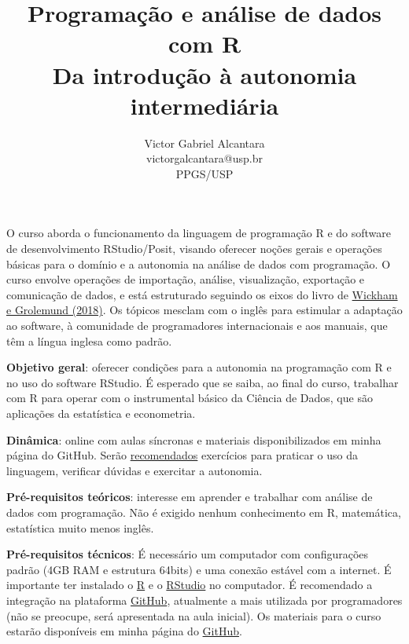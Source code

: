 \documentclass[a4paper,12pt]{article}
\title{\vspace{-3.5cm}Programação e análise de dados com R \\ \large Da introdução à autonomia intermediária}
\author{Victor Gabriel Alcantara \\ victorgalcantara@usp.br \\ PPGS/USP}
\date{}
\begin{document}
\maketitle

O curso aborda o funcionamento da linguagem de programação R e do software de desenvolvimento RStudio/Posit, visando oferecer noções gerais e operações básicas para o domínio e a autonomia na análise de dados com programação. O curso envolve operações de importação, análise, visualização, exportação e comunicação de dados, e está estruturado seguindo os eixos do livro de \href{https://r4ds.had.co.nz/}{Wickham e Grolemund (2018)}\cite{wickham2017}. Os tópicos mesclam com o inglês para estimular a adaptação ao software, à comunidade de programadores internacionais e aos manuais, que têm a língua inglesa como padrão.

\vspace{1cm}

\textbf{Objetivo geral}: oferecer condições para a autonomia na programação com R e no uso do software RStudio. É esperado que se saiba, ao final do curso, trabalhar com R para operar com o instrumental básico da Ciência de Dados, que são aplicações da estatística e econometria.

\vspace{0.5cm}

\textbf{Dinâmica}: online com aulas síncronas e materiais disponibilizados em minha página do GitHub. Serão \underline{recomendados} exercícios para praticar o uso da linguagem, verificar dúvidas e exercitar a autonomia.

\vspace{0.5cm}

\textbf{Pré-requisitos teóricos}: interesse em aprender e trabalhar com análise de dados com programação. Não é exigido nenhum conhecimento em R, matemática, estatística muito menos inglês.

\vspace{0.5cm}

\textbf{Pré-requisitos técnicos}: É necessário um computador com configurações padrão (4GB RAM e estrutura 64bits) e uma conexão estável com a internet. É importante ter instalado o \href{https://brieger.esalq.usp.br/CRAN/}{R} e o \href{https://www.rstudio.com/products/rstudio/download}{RStudio} no computador. É recomendado a integração na plataforma \href{https://github.com/}{GitHub}, atualmente a mais utilizada por programadores (não se preocupe, será apresentada na aula inicial). Os materiais para o curso estarão disponíveis em minha página do \href{https://github.com/victorgalcantara?tab=repositories}{GitHub}.
\end{document}

